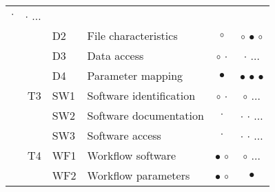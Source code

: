 \documentclass[10pt,letterpaper]{article}
\providecommand{\DIFaddtex}[1]{{\protect\color{blue}\uwave{#1}}} %
\providecommand{\DIFdeltex}[1]{{\protect\color{red}\sout{#1}}}                      %
\providecommand{\DIFaddFL}[1]{\DIFadd{#1}} %
\providecommand{\DIFdelFL}[1]{\DIFdel{#1}} %
\providecommand{\DIFaddbeginFL}{} %
\providecommand{\DIFaddendFL}{} %
\providecommand{\DIFdelbeginFL}{} %
\providecommand{\DIFdelendFL}{} %
\providecommand{\DIFadd}[1]{\texorpdfstring{\DIFaddtex{#1}}{#1}} %
\providecommand{\DIFdel}[1]{\texorpdfstring{\DIFdeltex{#1}}{}} %
\newcommand{\DIFscaledelfig}{0.5}
\newlength{\DIFdelgraphicswidth} %
\newlength{\DIFdelgraphicsheight} %
\newcommand{\DIFaddincludegraphics}[2][]{{\color{blue}\fbox{\DIFOincludegraphics[#1]{#2}}}} %
\newcommand{\DIFdelincludegraphics}[2][]{%
\sbox{\DIFdelgraphicsbox}{\DIFOincludegraphics[#1]{#2}}%
\settoboxwidth{\DIFdelgraphicswidth}{\DIFdelgraphicsbox} %
\settoboxtotalheight{\DIFdelgraphicsheight}{\DIFdelgraphicsbox} %
\scalebox{\DIFscaledelfig}{%
\parbox[b]{\DIFdelgraphicswidth}{\usebox{\DIFdelgraphicsbox}\\[-\baselineskip] \rule{\DIFdelgraphicswidth}{0em}}\llap{\resizebox{\DIFdelgraphicswidth}{\DIFdelgraphicsheight}{%
\setlength{\unitlength}{\DIFdelgraphicswidth}%
\begin{picture}(1,1)%
\thicklines\linethickness{2pt} %
{\color[rgb]{1,0,0}\put(0,0){\framebox(1,1){}}}%
{\color[rgb]{1,0,0}\put(0,0){\line( 1,1){1}}}%
{\color[rgb]{1,0,0}\put(0,1){\line(1,-1){1}}}%
\end{picture}%
}\hspace*{3pt}}} %
} %
\DeclareRobustCommand{\DIFaddbeginFL}{\DIFOaddbeginFL \let\includegraphics\DIFaddincludegraphics} %
\DeclareRobustCommand{\DIFaddendFL}{\DIFOaddendFL \let\includegraphics\DIFOincludegraphics} %
\DeclareRobustCommand{\DIFdelbeginFL}{\DIFOdelbeginFL \let\includegraphics\DIFdelincludegraphics} %
\DeclareRobustCommand{\DIFdelendFL}{\DIFOaddendFL \let\includegraphics\DIFOincludegraphics} %
\begin{document}
\begin{table}[ht]
\begin{adjustwidth}{-5cm}{0in}
\begin{tabular}{c|r|l|l|c|c}
\DIFdelendFL $\cdot$ &  $\cdot$ \DIFdelbeginFL %
\DIFdelFL{$\dots$ }\DIFdelendFL \\
\DIFaddbeginFL \DIFaddFL{$\circ$ }\DIFaddendFL & \DIFaddbeginFL & \DIFaddendFL D2 & File characteristics     & $\circ$ & $\circ$ \DIFdelbeginFL %
\DIFdelFL{$\bullet$ }%
\DIFdelFL{$\circ$ }\DIFdelendFL \\
\DIFaddbeginFL \DIFaddFL{$\circ$ }\DIFaddendFL & \DIFaddbeginFL & \DIFaddendFL D3 & Data access              &  \DIFdelbeginFL \DIFdelFL{$\circ$ }%
\DIFdelendFL $\cdot$ &  $\cdot$  \DIFdelbeginFL %
\DIFdelFL{$\dots$ }\DIFdelendFL \\ 
\DIFaddbeginFL \DIFaddFL{$\bullet$ }\DIFaddendFL & \DIFaddbeginFL & \DIFaddendFL D4 & Parameter mapping        & $\bullet$ & $\bullet$ \DIFdelbeginFL %
\DIFdelFL{$\bullet$ }%
\DIFdelFL{$\bullet$ }\DIFdelendFL \\ \hline 
\DIFaddbeginFL \DIFaddFL{$\bullet$ }& \DIFaddendFL T3 & SW1 & Software identification &  \DIFdelbeginFL \DIFdelFL{$\circ$ }%
\DIFdelendFL $\cdot$ & \DIFdelbeginFL \DIFdelFL{$\circ$ }%
\DIFdelFL{$\dots$ }\DIFdelendFL \DIFaddbeginFL \DIFaddFL{$\bullet$  }\DIFaddendFL \\ 
\DIFaddbeginFL \DIFaddFL{$\bullet$ }\DIFaddendFL & \DIFaddbeginFL & \DIFaddendFL SW2 & Software documentation  &  $\cdot$ & \DIFdelbeginFL \DIFdelFL{$\cdot$ }%
\DIFdelFL{$\cdot$ }%
\DIFdelFL{$\dots$ }\DIFdelendFL \DIFaddbeginFL \DIFaddFL{$\bullet$  }\DIFaddendFL \\  
\DIFaddbeginFL \DIFaddFL{$\bullet$ }\DIFaddendFL & \DIFaddbeginFL & \DIFaddendFL SW3 & Software access         &  $\cdot$ & \DIFdelbeginFL \DIFdelFL{$\cdot$ }%
\DIFdelFL{$\cdot$ }%
\DIFdelFL{$\dots$ }\DIFdelendFL \DIFaddbeginFL \DIFaddFL{$\bullet$ }\DIFaddendFL \\ \hline 
\DIFaddbeginFL \DIFaddFL{$\bullet$ }& \DIFaddendFL T4 & WF1 & Workflow software    & \DIFdelbeginFL \DIFdelFL{$\bullet$ }%
\DIFdelendFL $\circ$ & \DIFdelbeginFL \DIFdelFL{$\circ$ }%
\DIFdelFL{$\dots$ }\DIFdelendFL \DIFaddbeginFL \DIFaddFL{$\bullet$  }\DIFaddendFL \\ 
\DIFaddbeginFL \DIFaddFL{$\bullet$ }\DIFaddendFL & \DIFaddbeginFL & \DIFaddendFL WF2 & Workflow parameters     & \DIFdelbeginFL \DIFdelFL{$\bullet$ }%
\DIFdelendFL $\circ$ & $\bullet$  \DIFdelbeginFL %

\end{tabular}
\end{adjustwidth}
\end{table}
\end{document}
